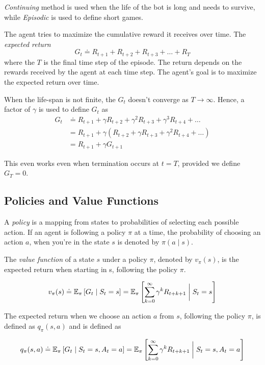 \textit{Continuing} method is used when the life of the bot is long and needs to survive, while \textit{Episodic} is used to define short games.

The agent tries to maximize the cumulative reward it receives over time. The \textit{expected return}\begin{equation}
    G_t \doteq R_{t+1} + R_{t+2} + R_{t+3} + \dots + R_T
\end{equation} where the $T$ is the final time step of the episode. The return depends on the rewards received by the agent at each time step. The agent's goal is to maximize the expected return over time.

When the life-span is not finite, the $G_t$ doesn't converge as $T\rightarrow \infty$. Hence, a factor of $\gamma$ is used to define $G_t$ as
\begin{align*}
    G_t &\doteq R_{t+1} + \gamma R_{t+2} + \gamma^2 R_{t+3} + \gamma^3 R_{t+4} + \dots \\
    &= R_{t+1} + \gamma(R_{t+2} + \gamma R_{t+3} + \gamma^2 R_{t+4} + \dots) \\
    &= R_{t+1} + \gamma G_{t+1}
\end{align*}

This even works even when termination occurs at $t=T$, provided we define $G_T=0$.

\subsection{Policies and Value Functions}

A \textit{policy} is a mapping from states to probabilities of selecting each possible action. If an agent is following a policy $\pi$ at a time, the probability of choosing an action $a$, when you're in the state $s$ is denoted by $\pi(a \mid s)$.

The \textit{value function} of a state $s$ under a policy $\pi$, denoted by $v_\pi(s)$, is the expected return when starting in s, following the policy $\pi$.

\begin{equation}
    v_\pi(s) \doteq \mathbb{E}_\pi\left[G_t\mid S_t=s\right] = \mathbb{E}_\pi\left[\sum_{k=0}^{\infty}\gamma^{k}R_{t+k+1} \biggm| S_t=s\right]
\end{equation}

The expected return when we choose an action $a$ from $s$, following the policy $\pi$, is defined as $q_\pi(s, a)$ and is defined as

\begin{equation}
    q_\pi(s, a) \doteq \mathbb{E}_\pi\left[G_t\mid S_t=s, A_t=a\right] = \mathbb{E}_\pi\left[\sum_{k=0}^{\infty}\gamma^{k}R_{t+k+1} \biggm| S_t=s, A_t=a\right]
\end{equation}

